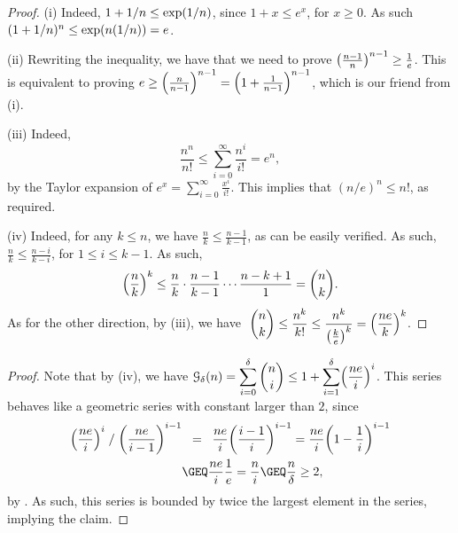 \begin{proof}
    (i) Indeed, $1+1/n\leq \exp \pth{1/n}$, since $1+x \leq e^x$, for
    $x \geq 0$. As such $(1+1/n)^n \leq \exp\pth{n(1/n)} = e$.
    
    (ii) Rewriting the inequality, we have that we need to prove
    $\pth{\frac{n-1}{n}}^{n-1} \geq \frac{1}{e}$. This is equivalent
    to proving $e \geq \pth{\frac{n}{n-1}}^{n-1} = \pth{
       1+\frac{1}{n-1}}^{n-1}$, which is our friend from (i).
    
    (iii) Indeed,
    \begin{equation*}
        \frac{n^n}{n!} \leq \sum_{i=0}^{\infty} \frac{n^i}{i!} = e^n,        
    \end{equation*}
    by the Taylor expansion of $e^x = \sum_{i=0}^\infty
    \frac{x^i}{i!}$. This implies that $(n/e)^n \leq n!$, as required.
    
    (iv) Indeed, for any $k \leq n$, we have $\frac{n}{k} \leq
    \frac{n-1}{k-1}$, as can be easily verified. As such, $\frac{n}{k}
    \leq \frac{n-i}{k-i}$, for $1 \leq i \leq k-1$. As such,
    \begin{equation*}
        \pth{\frac{n}{k}}^k \leq \frac{n}{k} \cdot \frac{n-1}{k-1} \cdots
        \frac{n-k+1} {1} = \binom{n}{k}.        
    \end{equation*}
    As for the other direction, by (iii), we have $\displaystyle\;
    \binom{n}{k} \leq \frac{n^k}{k!} \leq
    \frac{n^k}{\pth{\frac{k}{e}}^{k}} = \pth{ \frac{n e}{k} }^k$.
\end{proof}


   

\begin{proof}
    Note that by  (iv), we have
    $\displaystyle \Growth{\Dim}{n} = \sum_{i=0}^{\Dim} \binom{n}{i}
    \leq 1 + \sum_{i=1}^{\Dim} \pth{\frac{ne}{i}}^i$.
    This series behaves like a geometric series with constant larger
    than $2$, since
    \begin{align*}
        {\pth{\frac{ne}{i}}^i} \;/ \; {\pth{\frac{ne}{i-1}}^{i-1}}%
        &\EQ%
        \frac{ne }{i} \pth{\frac{i-1}{i}}^{i-1} = \frac{ne }{i} \pth{1 -
           \frac{1}{i}}^{i-1}
        \\&
        \GEQ%
        \frac{ne }{i} \frac{1}{e} = \frac{n}{i}
        \GEQ%
        \frac{n}{\Dim} \geq 2,        
    \end{align*}
    by . As such, this series is bounded by
    twice the largest element in the series, implying the claim.
\end{proof}

